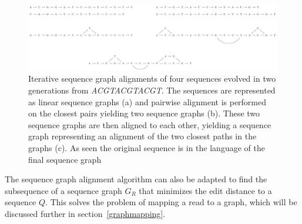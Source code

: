 \begin{figure}
  \includegraphics[width=\textwidth,height=\textheight,keepaspectratio]{figures/graph_msa}
  \caption{Iterative sequence graph alignments of four sequences evolved in two generations from \emph{ACGTACGTACGT}.
    The sequences are represented as linear sequence graphs (a) and pairwise alignment is performed on the closest pairs yielding two sequence graphs (b). These two sequence graphs are then aligned to each other, yielding a sequence graph representing an alignment of the two closest paths in the graphs (c). As seen the original sequence is in the language of the final sequence graph}
  \label{fig:treealign}
\end{figure}

The sequence graph alignment algorithm can also be adapted to find the subsequence of a sequence graph $G_R$ that minimizes the edit distance to a sequence $Q$. This solves the problem of mapping a read to a graph, which will be discussed further in section~\ref{graphmapping}.

